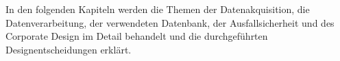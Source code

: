 In den folgenden Kapiteln werden die Themen der Datenakquisition, die Datenverarbeitung, der verwendeten Datenbank, der Ausfallsicherheit und des Corporate Design im Detail behandelt und die durchgeführten Designentscheidungen erklärt.